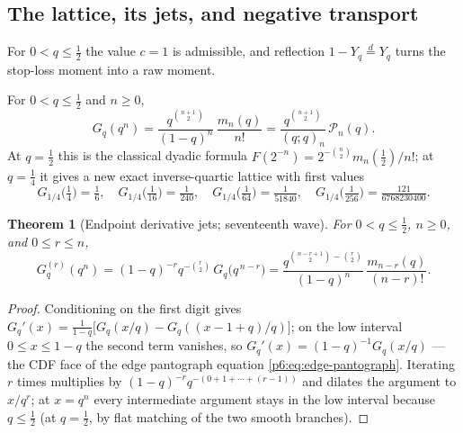 \documentclass[11pt,oneside]{article}
\numberwithin{equation}{section}
\newtheorem{theorem}{Theorem}[section]
\theoremstyle{definition}
\theoremstyle{remark}
\begin{document}
\subsection{The lattice, its jets, and negative transport}

For $0<q\le\tfrac12$ the value $c=1$ is admissible, and reflection
$1-Y_q\overset d=Y_q$ turns the stop-loss moment into a raw moment.

\begin{corollary}
\label{p7:cor:inverse-geometric}
For $0<q\le\tfrac12$ and $n\ge0$,
\begin{equation}\label{p7:eq:inverse-geometric}
 \boxed{\ G_q(q^n)=
 \frac{q^{\binom{n+1}2}}{(1-q)^n}\,\frac{m_n(q)}{n!}
 =\frac{q^{\binom{n+1}2}}{(q;q)_n}\,\mathcal P_n(q).\ }
\end{equation}
At $q=\tfrac12$ this is the classical dyadic formula
$F(2^{-n})=2^{-\binom n2}m_n(\tfrac12)/n!$; at $q=\tfrac14$ it gives a new
exact inverse-quartic lattice with first values
\begin{equation}\label{p7:eq:quartic-values}
 G_{1/4}\bigl(\tfrac14\bigr)=\tfrac16,\quad
 G_{1/4}\bigl(\tfrac1{16}\bigr)=\tfrac1{240},\quad
 G_{1/4}\bigl(\tfrac1{64}\bigr)=\tfrac1{51840},\quad
 G_{1/4}\bigl(\tfrac1{256}\bigr)=\tfrac{121}{6768230400}.
\end{equation}
\end{corollary}

\begin{theorem}[Endpoint derivative jets; seventeenth wave]
\label{p7:thm:endpoint-jets}
For $0<q\le\tfrac12$, $n\ge0$, and $0\le r\le n$,
\begin{equation}\label{p7:eq:endpoint-jet}
 \boxed{\ G_q^{(r)}(q^n)=
 (1-q)^{-r}q^{-\binom r2}\,G_q\bigl(q^{\,n-r}\bigr)
 =\frac{q^{\binom{n-r+1}2-\binom r2}}{(1-q)^n}\,
 \frac{m_{n-r}(q)}{(n-r)!}.\ }
\end{equation}
\end{theorem}

\begin{proof}
Conditioning on the first digit gives
$G_q'(x)=\tfrac1{1-q}\bigl[G_q(x/q)-G_q((x-1+q)/q)\bigr]$; on the low
interval $0\le x\le1-q$ the second term vanishes, so
$G_q'(x)=(1-q)^{-1}G_q(x/q)$ --- the CDF face of the edge pantograph equation
\eqref{p6:eq:edge-pantograph}.  Iterating $r$ times multiplies by
$(1-q)^{-r}q^{-(0+1+\cdots+(r-1))}$ and dilates the argument to $x/q^r$; at
$x=q^n$ every intermediate argument stays in the low interval because
$q\le\tfrac12$ (at $q=\tfrac12$, by flat matching of the two smooth
branches).
\end{proof}
\end{document}
